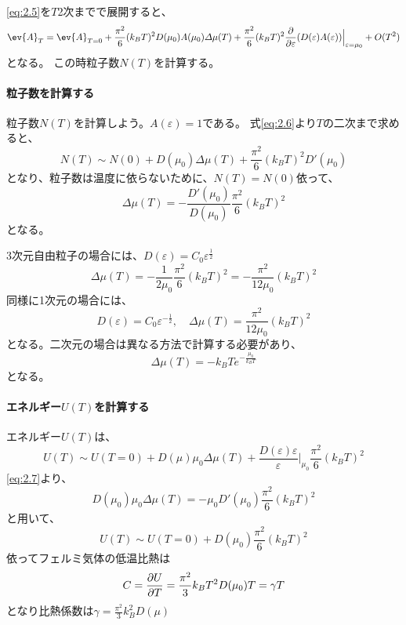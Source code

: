 \documentclass[titlepage]{ltjsarticle}
\begin{document}
\eqref{eq:2.5}を\(T\)2次までで展開すると、
\begin{equation}\label{eq:2.6}
  \ev{A}_T = \ev{A}_{T=0} + \frac{\pi^2}{6}(k_BT)^2 D(\mu_0)A(\mu_0)\varDelta \mu(T) + \frac{\pi^2}{6}(k_BT)^2 \pdv{}{\varepsilon}(D(\varepsilon)A(\varepsilon))\Big|_{\varepsilon=\mu_0} + O(T^2)
\end{equation}
となる。
この時粒子数\(N(T)\)を計算する。

\paragraph{粒子数を計算する}
粒子数\(N(T)\)を計算しよう。\(A(\varepsilon)=1\)である。
式\eqref{eq:2.6}より\(T\)の二次まで求めると、
\begin{equation}
  N(T) \sim N(0) + D(\mu_0)\Delta \mu(T) + \frac{\pi^2}{6}(k_BT)^2 D'(\mu_0)
\end{equation}
となり、粒子数は温度に依らないために、\(N(T)=N(0)\)依って、
\begin{equation}\label{eq:2.7}
  \varDelta \mu(T) = -\frac{D'(\mu_0)}{D(\mu_0)}\frac{\pi^2}{6}(k_BT)^2
\end{equation}
となる。


3次元自由粒子の場合には、\(D(\varepsilon)=C_0\varepsilon^{\frac{1}{2}}\)
\begin{equation}
  \varDelta \mu(T) = -\frac{1}{2\mu_0} \frac{\pi^2}{6}(k_BT)^2 = -\frac{\pi^2}{12\mu_0}(k_BT)^2
\end{equation}
同様に1次元の場合には、
\begin{equation}
  D(\varepsilon) = C_0\varepsilon^{-\frac{1}{2}} , \quad \varDelta \mu(T) = \frac{\pi^2}{12 \mu_0}(k_BT)^2
\end{equation}
となる。二次元の場合は異なる方法で計算する必要があり、
\begin{equation}
  \varDelta \mu(T) = -k_BT e^{-\frac{\mu_0}{k_BT}}
\end{equation}
となる。

\paragraph{エネルギー\(U(T)\)を計算する}
エネルギー\(U(T)\)は、
\begin{equation}
  U(T) \sim U(T=0) + D(\mu)\mu_0 \varDelta \mu(T) + \frac{D(\varepsilon)\varepsilon}{\varepsilon}\Big|_{\mu_0}\frac{\pi^2}{6}(k_BT)^2
\end{equation}
\eqref{eq:2.7}より、
\begin{equation}
  D(\mu_0)\mu_0 \varDelta \mu(T) = -\mu_0 D'(\mu_0)\frac{\pi^2}{6}(k_BT)^2
\end{equation}
と用いて、
\begin{equation}
  U(T) \sim U(T=0) + D(\mu_0) \frac{\pi^2}{6}(k_BT)^2 
\end{equation}
依ってフェルミ気体の低温比熱は
\begin{equation}
  C = \pdv{U}{T} = \frac{\pi^2}{3}k_BT^2 D(\mu_0) T = \gamma T 
\end{equation}
となり比熱係数は\(\gamma = \frac{\pi^2}{3}k_B^2 D(\mu)\)
\end{document}
